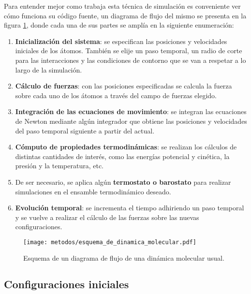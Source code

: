 Para entender mejor como trabaja esta técnica de simulación es conveniente ver
cómo funciona su código fuente, un diagrama de flujo del mismo se presenta en 
la figura \ref{fig:esquema_md}, donde cada una de sus partes se amplía en la 
siguiente enumeración:
\begin{enumerate}
    \item \textbf{Inicialización del sistema}: se especifican las posiciones y
        velocidades iniciales de los átomos. También se elije un paso temporal, 
        un radio de corte para las interacciones y las condiciones de contorno que
        se van a respetar a lo largo de la simulación. 
    \item \textbf{Cálculo de fuerzas}: con las posiciones especificadas se
        calcula la fuerza sobre cada uno de los átomos a través del campo de 
        fuerzas elegido.
    \item \textbf{Integración de las ecuaciones de movimiento}: se integran las
        ecuaciones de Newton mediante algún integrador que obtiene las posiciones
        y velocidades del paso temporal siguiente a partir del actual.
    \item \textbf{Cómputo de propiedades termodinámicas}: se realizan los
        cálculos de distintas cantidades de interés, como las energías potencial
        y cinética, la presión y la temperatura, etc.
    \item De ser necesario, se aplica algún \textbf{termostato o barostato}
        para realizar simulaciones en el ensamble termodinámico deseado.
    \item \textbf{Evolución temporal}: se incrementa el tiempo adhiriendo un
        paso temporal y se vuelve a realizar el cálculo de las fuerzas sobre las 
        nuevas configuraciones.
\end{enumerate}

\begin{figure}
    \centering
    \texttt{[image: metodos/esquema\_de\_dinamica\_molecular.pdf]}
    \caption{Esquema de un diagrama de flujo de una dinámica molecular usual.}
    \label{fig:esquema_md}
\end{figure}

\subsection{Configuraciones iniciales}

